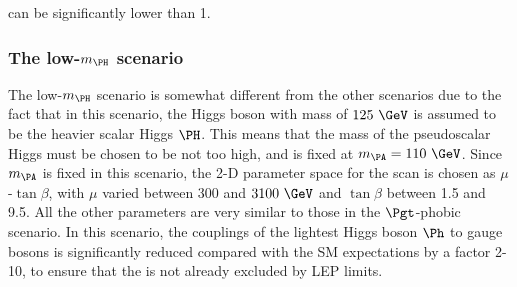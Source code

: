 can be significantly lower than 1.

\subsubsection{The low-$m_{\PH}$ scenario}
\label{sec:lowmHscenario}

The low-$m_{\PH}$ scenario is somewhat different from the other scenarios due to
the fact that in this scenario, the Higgs boson with mass of $125~\GeV$ is
assumed to be the heavier scalar Higgs $\PH$. This means that the mass of the
pseudoscalar Higgs must be chosen to be not too high, and is fixed at $m_{\PA} =
110~\GeV$. Since $m_{\PA}$ is fixed in this scenario, the 2-D parameter space
for the scan is chosen as $\mu$-$\tan\beta$, with $\mu$ varied between 300 and
$3100~\GeV$ and $\tan\beta$ between 1.5 and 9.5. All the other parameters are
very similar to those in the $\Pgt$-phobic scenario. In this scenario, the
couplings of the lightest Higgs boson $\Ph$ to gauge bosons is significantly
reduced compared with the \ac{SM} expectations by a factor 2-10, to ensure that
the \Ph is not already excluded by LEP limits. 

